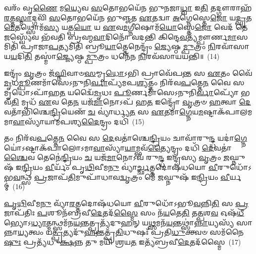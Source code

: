 𑌵𑌰𑌂᳴ 𑌵𑍃\-\ul{𑌣𑍈} 𑌮\-\ul{𑌯𑍍𑌯𑍇}\-𑌵 \ul{𑌸}\-𑌤𑍋𑌭𑌯𑍇᳴𑌨 𑌭𑍁𑌨𑌜𑌾\-\ul{𑌧𑍍𑌵𑌾} 𑌇\-\ul{𑌤𑌿} 𑌤𑌦𑍍𑌗𑍗𑌰𑌾𑌹᳴\-\ul{𑌰}\-𑌤𑍍𑌤\-\ul{𑌸𑍍𑌮𑌾}\-𑌦𑍍𑌗𑌵𑌿᳴ \ul{𑌸}\-𑌤𑍋𑌭𑌯𑍇᳴𑌨 𑌭𑍁𑌞𑍍𑌜𑌤 \ul{𑌏}\-𑌤𑌦𑍍𑌵𑌾 \ul{𑌅}\-𑌗𑍍𑌨𑍇𑌸𑍍𑌤𑍇\-\ul{𑌜𑍋} 𑌯\-\ul{𑌦𑍍𑌘𑍃}\-𑌤\-\ul{𑌮𑍇}\-𑌤𑌥𑍍𑌸𑍋𑌮᳴\-\ul{𑌸𑍍𑌯} 𑌯𑌤𑍍𑌪\-\ul{𑌯𑍋} 𑌯 \ul{𑌏}\-𑌵\-\ul{𑌮}\-𑌗𑍍𑌨𑍀𑌷𑍋𑌮᳴\-\ul{𑌯𑍋}\-𑌸𑍍𑌤𑍇\-\ul{𑌜𑍋} 𑌵𑍇𑌦᳴ 𑌤𑍇\-\ul{𑌜}\-𑌸𑍍𑌵𑍍𑌯𑍇᳴𑌵 𑌭᳴𑌵𑌤𑌿 𑌬𑍍𑌰𑌹𑍍𑌮\-\ul{𑌵𑌾}\-𑌦𑌿𑌨𑍋᳴ 𑌵𑌦𑌨𑍍𑌤𑌿 𑌕𑌿𑌨𑍍𑌦𑍇\-\ul{𑌵}\-𑌤𑍍𑌯᳴𑌮𑍍𑌪𑍗𑌰𑍍𑌣\-\ul{𑌮𑌾}\-𑌸𑌮𑌿𑌤𑌿᳴ 𑌪𑍍𑌰𑌾𑌜𑌾\-\ul{𑌪}\-𑌤𑍍𑌯𑌮𑌿𑌤𑌿᳴ 𑌬𑍍𑌰𑍂\-\ul{𑌯𑌾}\-𑌤𑍍𑌤𑍇𑌨𑍇𑌨𑍍𑌦𑍍𑌰𑌂᳴ \ul{𑌜𑍍𑌯𑍇}\-𑌷𑍍𑌠\-\ul{𑌮𑍍𑌪𑍁}\-𑌤𑍍𑌰𑌂 \ul{𑌨𑌿}\-𑌰𑌵𑌾᳴𑌸𑌾𑌯\-\ul{𑌯}\-𑌦𑌿\-\ul{𑌤𑌿} 𑌤𑌸𑍍𑌮𑌾॑\-\ul{𑌜𑍍𑌜𑍍𑌯𑍇}\-𑌷𑍍𑌠\-\ul{𑌮𑍍𑌪𑍁}\-𑌤𑍍𑌰𑌂 𑌧𑌨𑍇᳴𑌨 \ul{𑌨𑌿}\-𑌰𑌵᳴𑌸𑌾𑌯𑌯𑌨𑍍𑌤𑌿॥~(14)

{\anuvakamend[{\-\ul{𑌅}\-\-\ul{𑌸𑍍𑌯} 𑌮𑌾 𑌵𑍇𑌦𑌾 𑌦𑍍𑌯𑌾𑌵𑌾᳴𑌪𑍃\-\ul{𑌥𑌿}\-𑌵𑍍𑌯𑍋𑌰᳴𑌬𑍍𑌰\-\ul{𑌵𑍀}\-𑌦𑌿\-\ul{𑌤𑌿} 𑌤𑌸𑍍𑌮𑌾॑\-\ul{𑌚𑍍𑌚}\-𑌤𑍍𑌵𑌾𑌰𑌿᳴ 𑌚}]}%

𑌇𑌨𑍍𑌦𑍍𑌰𑌂᳴ \ul{𑌵𑍃}\-𑌤𑍍𑌰𑌂 𑌜᳴\-\ul{𑌘𑍍𑌨𑌿}\-𑌵𑌾𑍞\-\ul{𑌸}\-𑌮𑍍𑌮𑍃\-\ul{𑌧𑍋}\-\-𑌽𑌭𑌿 𑌪𑍍𑌰𑌾𑌵𑍇᳴𑌪\-\ul{𑌨𑍍𑌤} 𑌸 \ul{𑌏}\-𑌤𑌂 𑌵𑍈᳴\-\ul{𑌮𑍃}\-𑌧\-\ul{𑌮𑍍𑌪𑍂}\-𑌣𑌮𑌾᳴𑌸𑍇\-𑌽𑌨𑍁𑌨𑌿\-\ul{𑌰𑍍𑌵𑌾}\-𑌪𑍍𑌯᳴𑌮𑌪\-\ul{𑌶𑍍𑌯}\-𑌤𑍍𑌤𑌂 𑌨𑌿𑌰᳴𑌵\-\ul{𑌪}\-𑌤𑍍𑌤𑍇\-\ul{𑌨} 𑌵𑍈 𑌸 𑌮𑍃𑌧𑍋\-𑌽𑌪𑌾᳴𑌹\-\ul{𑌤} 𑌯𑌦𑍍𑌵𑍈᳴\-\ul{𑌮𑍃}\-𑌧𑌃 \ul{𑌪𑍂}\-𑌰𑍍𑌣𑌮𑌾᳴𑌸𑍇\-𑌽𑌨𑍁𑌨𑌿\-\ul{𑌰𑍍𑌵𑌾}\-𑌪𑍍𑌯𑍋᳴ 𑌭𑌵᳴\-\ul{𑌤𑌿} 𑌮𑍃𑌧᳴ \ul{𑌏}\-𑌵 𑌤𑍇\-\ul{𑌨} 𑌯𑌜᳴\-\ul{𑌮𑌾}\-𑌨𑍋\-𑌽𑌪᳴ 𑌹\-\ul{𑌤} 𑌇𑌨𑍍𑌦𑍍𑌰𑍋᳴ \ul{𑌵𑍃}\-𑌤𑍍𑌰𑍞 \ul{𑌹}\-𑌤𑍍𑌵𑌾 \ul{𑌦𑍇}\-𑌵𑌤𑌾᳴𑌭𑌿𑌶𑍍𑌚𑍇\-\ul{𑌨𑍍𑌦𑍍𑌰𑌿}\-𑌯𑍇𑌣᳴ \ul{𑌚} 𑌵𑍍𑌯𑌾॑𑌰𑍍𑌧𑍍𑌯\-\ul{𑌤} 𑌸 \ul{𑌏}\-𑌤𑌮𑌾॑\-\ul{𑌗𑍍𑌨𑍇}\-𑌯\-\ul{𑌮}\-𑌷𑍍𑌟𑌾𑌕᳴𑌪𑌾𑌲𑌮𑌮𑌾\-\ul{𑌵𑌾}\-𑌸𑍍𑌯𑌾᳴𑌯𑌾𑌮𑌪𑌶𑍍𑌯\-\ul{𑌦𑍈}\-𑌨𑍍𑌦𑍍𑌰𑌂 𑌦𑌧𑌿᳴~(15)

𑌤𑌂 𑌨𑌿𑌰᳴𑌵\-\ul{𑌪}\-𑌤𑍍𑌤𑍇\-\ul{𑌨} 𑌵𑍈 𑌸 \ul{𑌦𑍇}\-𑌵𑌤𑌾॑𑌶𑍍𑌚𑍇\-\ul{𑌨𑍍𑌦𑍍𑌰𑌿}\-𑌯𑌂 𑌚𑌾𑌵𑌾᳴𑌰𑍁\-\ul{𑌨𑍍𑌦𑍍𑌧} 𑌯𑌦𑌾॑\-\ul{𑌗𑍍𑌨𑍇}\-𑌯𑍋॑\-𑌽𑌷𑍍𑌟𑌾𑌕᳴𑌪𑌾𑌲𑍋\-𑌽𑌮𑌾\-\ul{𑌵𑌾}\-𑌸𑍍𑌯𑌾᳴\-\ul{𑌯𑌾}\-𑌮𑍍𑌭𑌵᳴\-\ul{𑌤𑍍𑌯𑍈}\-𑌨𑍍𑌦𑍍𑌰𑌂 𑌦𑌧𑌿᳴ \ul{𑌦𑍇}\-𑌵𑌤𑌾॑\-\ul{𑌶𑍍𑌚𑍈}\-𑌵 𑌤𑍇𑌨𑍇॑\-\ul{𑌨𑍍𑌦𑍍𑌰𑌿}\-𑌯𑌂 \ul{𑌚} 𑌯𑌜᳴\-\ul{𑌮𑌾}\-𑌨𑍋\-𑌽𑌵᳴ 𑌰𑍁\-\ul{𑌨𑍍𑌦𑍍𑌧} 𑌇𑌨𑍍𑌦𑍍𑌰᳴𑌸𑍍𑌯 \ul{𑌵𑍃}\-𑌤𑍍𑌰𑌂 \ul{𑌜}\-𑌘𑍍𑌨𑍁𑌷᳴ 𑌇\-\ul{𑌨𑍍𑌦𑍍𑌰𑌿}\-𑌯𑌂 \ul{𑌵𑍀}\-𑌰𑍍𑌯𑌂᳴ 𑌪𑍃\-\ul{𑌥𑌿}\-𑌵𑍀𑌮\-\ul{𑌨𑍁} 𑌵𑍍𑌯𑌾॑\-\ul{𑌰𑍍𑌚𑍍𑌛}\-𑌤𑍍𑌤𑌦𑍋𑌷᳴𑌧𑌯𑍋 \ul{𑌵𑍀}\-𑌰𑍁𑌧𑍋᳴\-𑌽𑌭\-\ul{𑌵}\-𑌨𑍍𑌥𑍍𑌸 \ul{𑌪𑍍𑌰}\-𑌜𑌾𑌪᳴\-\ul{𑌤𑌿}\-𑌮𑍁𑌪𑌾᳴𑌧𑌾𑌵\-\ul{𑌦𑍍𑌵𑍃}\-𑌤𑍍𑌰𑌂 𑌮𑍇᳴ \ul{𑌜}\-𑌘𑍍𑌨𑍁𑌷᳴ 𑌇\-\ul{𑌨𑍍𑌦𑍍𑌰𑌿}\-𑌯𑌂 \ul{𑌵𑍀}\-𑌰𑍍𑌯𑌮𑍍॑~(16)

\-\ul{𑌪𑍃}\-\-\ul{𑌥𑌿}\-𑌵𑍀𑌮\-\ul{𑌨𑍁} 𑌵𑍍𑌯𑌾᳴\-\ul{𑌰}\-𑌤𑍍𑌤𑌦𑍋𑌷᳴𑌧𑌯𑍋 \ul{𑌵𑍀}\-𑌰𑍁𑌧𑍋᳴\-𑌽𑌭𑍂\-\ul{𑌵}\-𑌨𑍍𑌨𑌿\-\ul{𑌤𑌿} 𑌸 \ul{𑌪𑍍𑌰}\-𑌜𑌾𑌪᳴𑌤𑌿𑌃 \ul{𑌪}\-𑌶𑍂𑌨᳴𑌬𑍍𑌰𑌵𑍀\-\ul{𑌦𑍇}\-𑌤𑌦᳴\-\ul{𑌸𑍍𑌮𑍈} 𑌸𑌂 𑌨᳴\-\ul{𑌯}\-𑌤𑍇\-\ul{𑌤𑌿} 𑌤\-\ul{𑌤𑍍𑌪}\-𑌶\-\ul{𑌵} 𑌓𑌷᳴\-\ul{𑌧𑍀}\-𑌭𑍍𑌯𑍋\-𑌽\-\ul{𑌧𑍍𑌯𑌾}\-𑌤𑍍𑌮𑌨𑍍𑌥𑍍𑌸𑌮᳴𑌨\-\ul{𑌯}\-𑌨𑍍𑌤𑌤𑍍𑌪𑍍𑌰𑌤𑍍𑌯᳴𑌦𑍁\-\ul{𑌹}\-𑌨𑍍 𑌯\-\ul{𑌥𑍍𑌸}\-𑌮𑌨᳴\-\ul{𑌯}\-𑌨𑍍𑌤𑌥𑍍𑌸𑌾॑\-\ul{𑌨𑍍𑌨𑌾}\-𑌯𑍍𑌯𑌸𑍍𑌯᳴ 𑌸𑌾𑌨𑍍𑌨𑌾\-\ul{𑌯𑍍𑌯}\-𑌤𑍍𑌵𑌂 𑌯\-\ul{𑌤𑍍𑌪𑍍𑌰}\-𑌤𑍍𑌯𑌦𑍁᳴\-\ul{𑌹}\-𑌨𑍍𑌤𑌤𑍍𑌪𑍍𑌰᳴\-\ul{𑌤𑌿}\-𑌧𑍁𑌷𑌃᳴ 𑌪𑍍𑌰𑌤𑌿\-\ul{𑌧𑍁}\-𑌕𑍍𑌤𑍍𑌵𑍞 𑌸𑌮᳴𑌨𑍈\-\ul{𑌷𑍁𑌃} 𑌪𑍍𑌰𑌤𑍍𑌯᳴𑌧𑍁\-\ul{𑌕𑍍𑌷}\-𑌨𑍍𑌨 𑌤𑍁 𑌮𑌯𑌿᳴ 𑌶𑍍𑌰𑌯\-\ul{𑌤} 𑌇𑌤𑍍𑌯᳴𑌬𑍍𑌰𑌵𑍀\-\ul{𑌦𑍇}\-𑌤𑌦᳴𑌸𑍍𑌮𑍈~(17)

